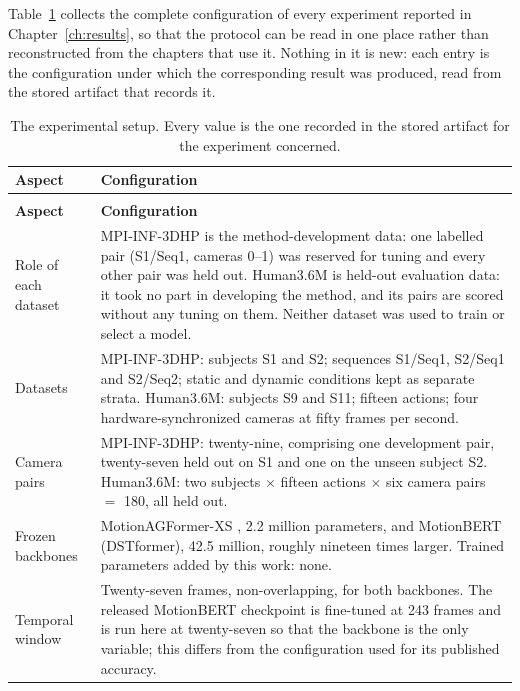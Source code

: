 \documentclass[12pt,a4paper]{report}
\begin{document}
Table~\ref{tab:setup} collects the complete configuration of every experiment reported in
Chapter~\ref{ch:results}, so that the protocol can be read in one place rather than
reconstructed from the chapters that use it. Nothing in it is new: each entry is the
configuration under which the corresponding result was produced, read from the stored
artifact that records it.

{\fontsize{10}{12}\selectfont
\setlength{\tabcolsep}{4pt}
\begin{longtable}{>{\raggedright\arraybackslash}p{3.4cm}>{\raggedright\arraybackslash}p{11.4cm}}
\caption[The experimental setup in one place]{The experimental setup. Every value is the one recorded in the stored artifact for the experiment concerned.}\label{tab:setup}\\
\hline
\textbf{Aspect} & \textbf{Configuration} \\
\hline
\endfirsthead
\multicolumn{2}{l}{\textit{Table \thetable\ (continued)}}\\
\hline
\textbf{Aspect} & \textbf{Configuration} \\
\hline
\endhead
Role of each dataset & MPI-INF-3DHP is the method-development data: one labelled pair (S1/Seq1, cameras 0--1) was reserved for tuning and every other pair was held out. Human3.6M is held-out evaluation data: it took no part in developing the method, and its pairs are scored without any tuning on them. Neither dataset was used to train or select a model. \\
Datasets & MPI-INF-3DHP: subjects S1 and S2; sequences S1/Seq1, S2/Seq1 and S2/Seq2; static and dynamic conditions kept as separate strata. Human3.6M: subjects S9 and S11; fifteen actions; four hardware-synchronized cameras at fifty frames per second. \\
Camera pairs & MPI-INF-3DHP: twenty-nine, comprising one development pair, twenty-seven held out on S1 and one on the unseen subject S2. Human3.6M: two subjects $\times$ fifteen actions $\times$ six camera pairs $=$ 180, all held out. \\
Frozen backbones & MotionAGFormer-XS \cite{motionagformer}, 2.2 million parameters, and MotionBERT \cite{motionbert} (DSTformer), 42.5 million, roughly nineteen times larger. Trained parameters added by this work: none. \\
Temporal window & Twenty-seven frames, non-overlapping, for both backbones. The released MotionBERT checkpoint is fine-tuned at 243 frames and is run here at twenty-seven so that the backbone is the only variable; this differs from the configuration used for its published accuracy. \\

\end{longtable}}
\end{document}
